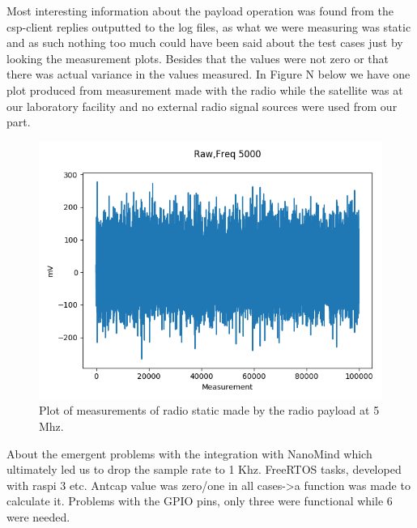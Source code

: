 \documentclass[english,12pt,a4paper,pdftex,elec,utf8]{aaltothesis}
\begin{document}
Most interesting information about the payload operation was found from the csp-client replies outputted to the log files, as what we were measuring was static and as such nothing too much could have been said about the test cases just by looking the measurement plots. Besides that the values were not zero or that there was actual variance in the values measured. In Figure N below we have one plot produced from measurement made with the radio while the satellite was at our laboratory facility and no external radio signal sources were used from our part.\par 
\begin{figure}[h!]
\includegraphics[scale=0.6]{m1_debug1}
\caption{Plot of measurements of radio static made by the radio payload at 5 Mhz.}
\end{figure}
About the emergent problems with the integration with NanoMind which ultimately led us to drop the sample rate to 1 Khz. FreeRTOS tasks, developed with raspi 3 etc. Antcap value was zero/one in all cases->a function was made to calculate it. Problems with the GPIO pins, only three were functional while 6 were needed.     
\end{document}
